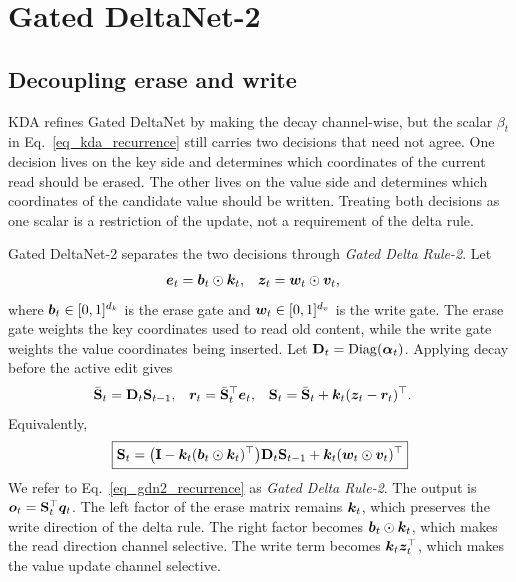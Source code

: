 \documentclass[10pt, logo, onecolumn, copyright]{nv}
\begin{document}
\section{Gated DeltaNet-2}
\label{sec_method}

\subsection{Decoupling erase and write}
\label{subsec_decoupling}

KDA refines Gated DeltaNet by making the decay channel-wise, but the scalar $\beta_t$ in Eq.~\ref{eq_kda_recurrence} still carries two decisions that need not agree. One decision lives on the key side and determines which coordinates of the current read should be erased. The other lives on the value side and determines which coordinates of the candidate value should be written. Treating both decisions as one scalar is a restriction of the update, not a requirement of the delta rule.

Gated DeltaNet-2 separates the two decisions through \emph{Gated Delta Rule-2}. Let
\begin{align}
    {\bm{e}}_t &= {\bm{b}}_t \odot {\bm{k}}_t,
    &
    {\bm{z}}_t &= {\bm{w}}_t \odot {\bm{v}}_t,
\label{eq_gdn2_e_z}
\end{align}
where ${\bm{b}}_t \in [0,1]^{d_k}$ is the erase gate and ${\bm{w}}_t \in [0,1]^{d_v}$ is the write gate. The erase gate weights the key coordinates used to read old content, while the write gate weights the value coordinates being inserted. Let ${\mathbf{D}}_t=\operatorname{Diag}({\bm{\alpha}}_t)$. Applying decay before the active edit gives
\begin{align}
    \bar{{\mathbf{S}}}_t &= {\mathbf{D}}_t{\mathbf{S}}_{t-1},
    &
    {\bm{r}}_t &= \bar{{\mathbf{S}}}_t^\top{\bm{e}}_t,
    &
    {\mathbf{S}}_t &= \bar{{\mathbf{S}}}_t + {\bm{k}}_t({\bm{z}}_t - {\bm{r}}_t)^\top .
\label{eq_gdn2_residual}
\end{align}
Equivalently,
\begin{equation}
    \boxed{
    {\mathbf{S}}_t
    = \bigl({\mathbf{I}} - {\bm{k}}_t({\bm{b}}_t \odot {\bm{k}}_t)^\top\bigr){\mathbf{D}}_t{\mathbf{S}}_{t-1}
    + {\bm{k}}_t({\bm{w}}_t \odot {\bm{v}}_t)^\top
    }
\label{eq_gdn2_recurrence}
\end{equation}
We refer to Eq.~\ref{eq_gdn2_recurrence} as \emph{Gated Delta Rule-2}. The output is ${\bm{o}}_t = {\mathbf{S}}_t^\top{\bm{q}}_t$.
The left factor of the erase matrix remains ${\bm{k}}_t$, which preserves the write direction of the delta rule. The right factor becomes ${\bm{b}}_t \odot {\bm{k}}_t$, which makes the read direction channel selective. The write term becomes ${\bm{k}}_t{\bm{z}}_t^\top$, which makes the value update channel selective.
\end{document}
